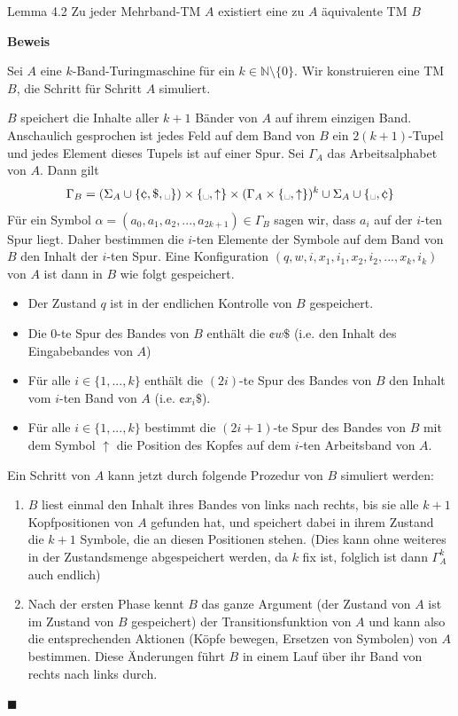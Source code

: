 \documentclass[a4paper, 11pt]{article}
\def\N{\mathbb{N}}
\begin{document}
        \begin{mainbox}{Lemma 4.2}
            Zu jeder Mehrband-TM $A$ existiert eine zu $A$ äquivalente TM $B$
        \end{mainbox}
        \textbf{Beweis}
        
        Sei $A$ eine $k$-Band-Turingmaschine für ein $k \in \N \setminus \{0\}$. Wir konstruieren eine TM $B$, die Schritt für Schritt $A$ simuliert.

        $B$ speichert die Inhalte aller $k+1$ Bänder von $A$ auf ihrem einzigen Band. Anschaulich gesprochen ist jedes Feld auf dem Band von $B$ ein $2(k+1)$-Tupel und jedes Element dieses Tupels ist auf einer Spur. 
        Sei $\Gamma_A$ das Arbeitsalphabet von $A$. Dann gilt 
        $$\Gamma_B = (\Sigma_A \cup \{\cent, \$, \text{\textvisiblespace}\}) \times \{\text{\textvisiblespace},\uparrow\} \times (\Gamma_A \times \{\text{\textvisiblespace}, \uparrow\})^k \cup \Sigma_A \cup \{\text{\textvisiblespace}, \cent\}$$
        Für ein Symbol $\alpha = (a_0,a_1,a_2,...,a_{2k+1}) \in \Gamma_B$ sagen wir, dass $a_i$ auf der $i$-ten Spur liegt. Daher bestimmen die $i$-ten Elemente der Symbole auf dem Band von $B$ den Inhalt der $i$-ten Spur. Eine Konfiguration $(q,w,i,x_1,i_1,x_2,i_2,...,x_k,i_k)$ von $A$ ist dann in $B$ wie folgt gespeichert. 
        \begin{itemize}
            \item Der Zustand $q$ ist in der endlichen Kontrolle von $B$ gespeichert. 
            \item Die $0$-te Spur des Bandes von $B$ enthält die $\cent w\$$ (i.e. den Inhalt des Eingabebandes von $A$)
            \item Für alle $i \in \{1, ..., k\}$ enthält die $(2i)$-te Spur des Bandes von $B$ den Inhalt vom $i$-ten Band von $A$ (i.e. $\cent x_i\$$).
            \item Für alle $i \in \{1, ..., k\}$ bestimmt die $(2i +1)$-te Spur des Bandes von $B$ mit dem Symbol $\uparrow$ die Position des Kopfes auf dem $i$-ten Arbeitsband von $A$.
        \end{itemize}
        Ein Schritt von $A$ kann jetzt durch folgende Prozedur von $B$ simuliert werden:
        \begin{enumerate}
            \item $B$ liest einmal den Inhalt ihres Bandes von links nach rechts, bis sie alle $k+1$ Kopfpositionen von $A$ gefunden hat, und speichert dabei in ihrem Zustand die $k+1$ Symbole, die an diesen Positionen stehen. (Dies kann ohne weiteres in der Zustandsmenge abgespeichert werden, da $k$ fix ist, folglich ist dann $\Gamma_A^k$ auch endlich)
            \item Nach der ersten Phase kennt $B$ das ganze Argument (der Zustand von $A$ ist im Zustand von $B$ gespeichert) der Transitionsfunktion von $A$ und kann also die entsprechenden Aktionen (Köpfe bewegen, Ersetzen von Symbolen) von $A$ bestimmen. Diese Änderungen führt $B$ in einem Lauf über ihr Band von rechts nach links durch.
        \end{enumerate}
        \hspace*{0pt}\hfill$\blacksquare$
    
\end{document}
